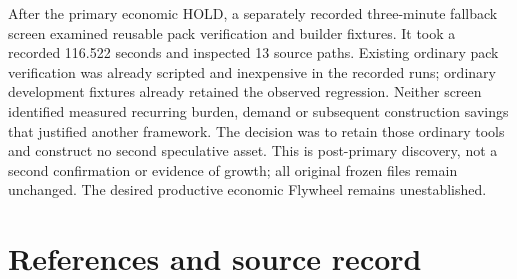 \documentclass[11pt,a4paper]{article}
\begin{document}
After the primary economic HOLD, a separately recorded three-minute fallback
screen examined reusable pack verification and builder fixtures. It took a
recorded 116.522 seconds and inspected 13 source paths. Existing ordinary pack
verification was already scripted and inexpensive in the recorded runs; ordinary
development fixtures already retained the observed regression. Neither screen
identified measured recurring burden, demand or subsequent construction savings
that justified another framework. The decision was to retain those ordinary
tools and construct no second speculative asset. This is post-primary discovery,
not a second confirmation or evidence of growth; all original frozen files remain
unchanged. The desired productive economic Flywheel remains unestablished.

\clearpage
\section*{References and source record}
\end{document}
